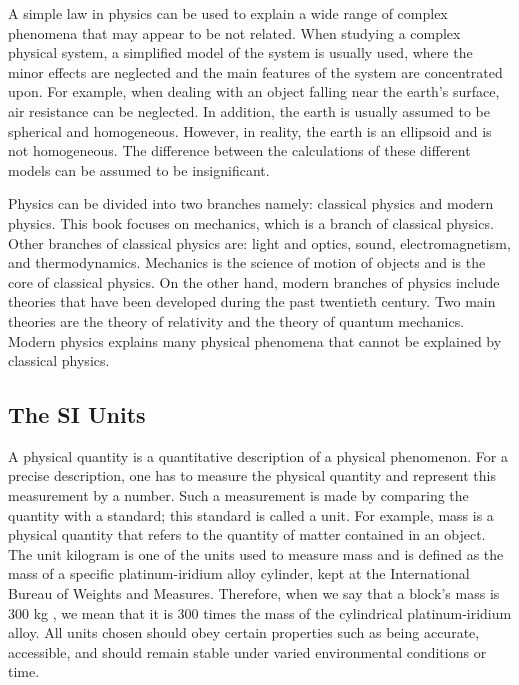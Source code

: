 \documentclass[10pt]{article}
\numberwithin{equation}{section}
\begin{document}
A simple law in physics can be used to explain a wide range of complex phenomena that may appear to be not related. When studying a complex physical system, a simplified model of the system is usually used, where the minor effects are neglected and the main features of the system are concentrated upon. For example, when dealing with an object falling near the earth's surface, air resistance can be neglected. In addition, the earth is usually assumed to be spherical and homogeneous. However, in reality, the earth is an ellipsoid and is not homogeneous. The difference between the calculations of these different models can be assumed to be insignificant.

Physics can be divided into two branches namely: classical physics and modern physics. This book focuses on mechanics, which is a branch of classical physics. Other branches of classical physics are: light and optics, sound, electromagnetism, and thermodynamics. Mechanics is the science of motion of objects and is the core of classical physics. On the other hand, modern branches of physics include theories that have been developed during the past twentieth century. Two main theories are the theory of relativity and the theory of quantum mechanics. Modern physics explains many physical phenomena that cannot be explained by classical physics.

\subsection{The SI Units}\label{sec:1-2}
A physical quantity is a quantitative description of a physical phenomenon. For a precise description, one has to measure the physical quantity and represent this measurement by a number. Such a measurement is made by comparing the quantity with a standard; this standard is called a unit. For example, mass is a physical quantity that refers to the quantity of matter contained in an object. The unit kilogram is one of the units used to measure mass and is defined as the mass of a specific platinum-iridium alloy cylinder, kept at the International Bureau of Weights and Measures. Therefore, when we say that a block's mass is 300 kg , we mean that it is 300 times the mass of the cylindrical platinum-iridium alloy. All units chosen should obey certain properties such as being accurate, accessible, and should remain stable under varied environmental conditions or time.
\end{document}
